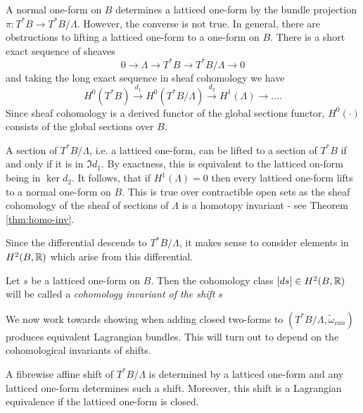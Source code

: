 A normal one-form on $B$ determines a latticed one-form by the bundle
projection $\pi: T^*B \to T^*B / \Lambda$. However, the converse is not true.
In general, there are obstructions to lifting a latticed one-form to a one-form
on $B$. There is a short exact sequence of sheaves $$ 0 \to \Lambda \to T^*B
    \to T^*B/ \Lambda \to 0 $$ and taking the long exact sequence in sheaf
cohomology we have $$ H^0(T^*B) \xrightarrow{d_1} H^0(T^*B/ \Lambda)
    \xrightarrow{d_2} H^1(\Lambda) \to \dots. $$ Since sheaf cohomology is a
derived functor of the global sections functor, $H^0(\cdot)$ consists of the
global sections over $B$.

A section of $T^*B/ \Lambda$, i.e. a latticed one-form, can be lifted to a
section of $T^*B$ if and only if it is in $\Im d_1$. By exactness, this is
equivalent to the latticed on-form being in $\ker d_2$. It follows, that if
$H^1(\Lambda) = 0$ then every latticed one-form lifts to a normal one-form on
$B$. This is true over contractible open sets as the sheaf cohomology of the
sheaf of sections of $\Lambda$ is a homotopy invariant - see Theorem
\ref{thm:homo-inv}.

Since the differential descends to $T^*B/\Lambda$, it makes sense to consider
elements in $H^2(B, \mathbb{R})$ which arise from this differential.
\begin{definition}\label{def:coho-inv-}
    Let $s$ be a latticed one-form on $B$. Then the cohomology class $[ds]\in H^2(B, \mathbb{R})$ will be called a \emph{cohomology invariant of the shift} $s$
\end{definition}

We now work towards showing when adding closed two-forms to $(T^*B/\Lambda,
    \tilde{\omega}_{can})$ produces equivalent Lagrangian bundles. This will turn
out to depend on the cohomological invariants of shifts.

\begin{prop}\label{prop:determines-shift}
    A fibrewise affine shift of $T^*B/\Lambda$ is determined by a latticed one-form and any latticed one-form determines such a shift. Moreover, this shift is a Lagrangian equivalence if the latticed one-form is closed.
\end{prop}

